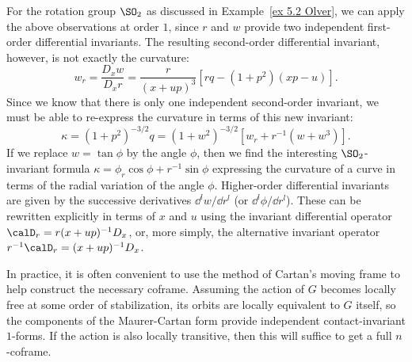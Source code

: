 \begin{example}
    For the rotation group $\SO_2$ as discussed in Example~\ref{ex 5.2 Olver}, we can apply the above observations at order $1$, since $r$ and $w$ provide two independent first-order differential invariants. The resulting second-order differential invariant, however, is not exactly the curvature:
    \[w_r=\frac{D_xw}{D_xr}=\frac{r}{(x+up)^3}\left[rq-(1+p^2)(xp-u)\right].\]
    Since we know that there is only one independent second-order invariant, we must be able to re-express the curvature in terms of this new invariant:
    \[\kappa=(1+p^2)^{-3/2}q=(1+w^2)^{-3/2}\left[w_r+r^{-1}(w+w^3)\right].\]
    If we replace $w=\tan\phi$ by the angle $\phi$, then we find the interesting $\SO_2$-invariant formula $\kappa=\phi_r\cos\phi+r^{-1}\sin\phi$ expressing the curvature of a curve in terms of the radial variation of the angle $\phi$. Higher-order differential invariants are given by the successive derivatives $\dd^l w/\dd r^l$ (or $\dd^l\phi/\dd r^l$). These can be rewritten explicitly in terms of $x$ and $u$ using the invariant differential operator $\calD_r=r(x+up)^{-1}D_x$, or, more simply, the alternative invariant operator $r^{-1}\calD_r=(x+up)^{-1}D_x$.
\end{example}

In practice, it is often convenient to use the method of Cartan's moving frame to help construct the necessary coframe. Assuming the action of $G$ becomes locally free at some order of stabilization, its orbits are locally equivalent to $G$ itself, so the components of the Maurer-Cartan form provide independent contact-invariant $1$-forms. If the action is also locally transitive, then this will suffice to get a full $n$-coframe.

